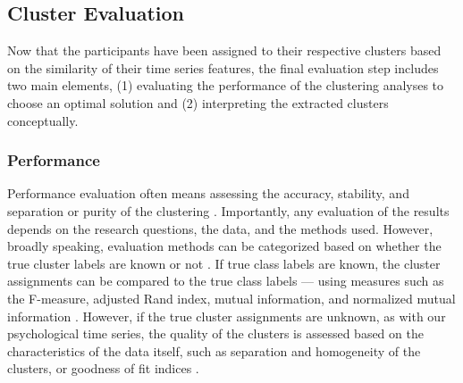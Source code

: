 \documentclass[man, 12pt, a4paper, mask, floatsintext]{apa7}
\theoremstyle{break}
\theoremstyle{plain}
\begin{document}





\subsection{Cluster Evaluation}
Now that the participants have been assigned to their respective clusters based on the similarity of their time series features, the final evaluation step includes two main elements, (1) evaluating the performance of the clustering analyses to choose an optimal solution and (2) interpreting the extracted clusters conceptually. 

\subsubsection{Performance}
Performance evaluation often means assessing the accuracy, stability, and separation or purity of the clustering \citep{keogh2003}. Importantly, any evaluation of the results depends on the research questions, the data, and the methods used. However, broadly speaking, evaluation methods can be categorized based on whether the true cluster labels are known or not \citep{saxena2017}. If true class labels are known, the cluster assignments can be compared to the true class labels --- using measures such as the F-measure, adjusted Rand index, mutual information, and normalized mutual information \citep[i.e., external evaluation; e.g.,][]{liao2005}. However, if the true cluster assignments are unknown, as with our psychological time series, the quality of the clusters is assessed based on the characteristics of the data itself, such as separation and homogeneity of the clusters, or goodness of fit indices \citep[i.e., internal evaluation; e.g.,][]{Aghabozorgi2015}. 
\end{document}
